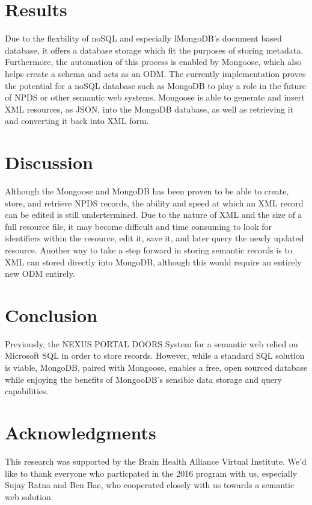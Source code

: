 \documentclass[10pt,twocolumn,twoside]{article}
\begin{document}
\section*{Results}
	Due to the flexbility of noSQL and especially lMongoDB's document based database, it offers a database storage which fit the purposes of storing metadata. Furthermore, the automation of this process is enabled by Mongoose, which also helps create a schema and acts as an ODM. The currently implementation proves the potential for a noSQL database such as MongoDB to play a role in the future of NPDS or other semantic web systems.  Mongoose is able to generate and insert XML resources, as JSON, into the MongoDB database, as well as retrieving it and converting it back into XML form. 


\section*{Discussion}
	Although the Mongoose and MongoDB has been proven to be able to create, store, and retrieve NPDS records, the ability and speed at which an XML record can be edited is still undertermined. Due to the nature of XML and the size of a full resource file, it may become difficult and time consuming to look for identifiers within the resource, edit it, save it, and later query the newly updated resource. Another way to take a step forward in storing semantic records is to XML can stored directly into MongoDB, although this would require an entirely new ODM entirely. 


\section*{Conclusion}
\label{secConclusion}
	Previously, the NEXUS PORTAL DOORS System for a semantic web relied on Microsoft SQL in order to store records. However, while a standard SQL solution is viable, MongoDB, paired with Mongoose, enables a free, open sourced database while enjoying the benefits of MongooDB's sensible data storage and query capabilities. 


\section*{Acknowledgments}
This research was supported by the Brain Health Alliance Virtual Institute. We'd like to thank everyone who particpated in the 2016 program with us, especially Sujay Ratna and Ben Bae, who cooperated closely with us towards a semantic web solution. 
\end{document}
